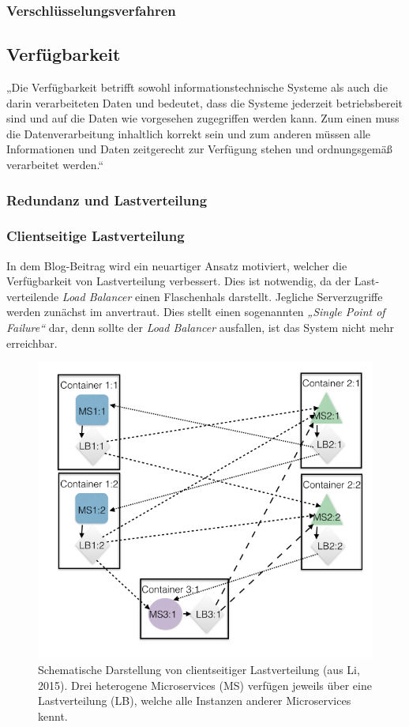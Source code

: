 \subsubsection{Verschlüsselungsverfahren}


\subsection{Verfügbarkeit}
\label{subsec:verfügbarkeit}
„Die Verfügbarkeit betrifft sowohl informationstechnische Systeme als auch die darin verarbeiteten Daten und bedeutet, dass die Systeme jederzeit betriebsbereit sind und auf die Daten wie vorgesehen zugegriffen werden kann. Zum einen muss die Datenverarbeitung inhaltlich korrekt sein und zum anderen müssen alle Informationen und Daten zeitgerecht zur Verfügung stehen und ordnungsgemäß verarbeitet werden.“ \cite{Bedner+10}

\subsubsection{Redundanz und Lastverteilung}

\subsubsection{Clientseitige Lastverteilung}

In dem Blog-Beitrag \cite{Li15} wird ein neuartiger Ansatz motiviert, welcher die Verfügbarkeit von Lastverteilung verbessert. Dies ist notwendig, da der Last-verteilende \textit{Load Balancer} einen Flaschenhals darstellt. Jegliche Serverzugriffe werden zunächst im anvertraut. Dies stellt einen sogenannten \textit{„Single Point of Failure“} dar, denn sollte der \textit{Load Balancer} ausfallen, ist das System nicht mehr erreichbar.

\begin{figure}
	\centering
	\includegraphics[width=.55\linewidth]{img/clientloadbal}
	\caption{Schematische Darstellung von clientseitiger Lastverteilung (aus Li, 2015). Drei heterogene Microservices (MS) verfügen jeweils über eine Lastverteilung (LB), welche alle Instanzen anderer Microservices kennt.}
	\label{fig:clientseitige_lastverteilung}
\end{figure}


